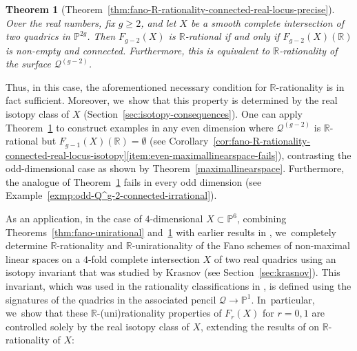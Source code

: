\documentclass[JEP,XML,SOM,Unicode,NoEqCountersInSection,published]{cedram}
\let\cal\mathcal
\let\bb\mathbb\let\Bbb\mathbb
\theoremstyle{plain}
\newtheorem{thm}{Theorem}[section]
\theoremstyle{definition}
\renewcommand\P{\mathbb{P}}
\newcommand\R{\mathbb{R}}
\begin{document}
\begin{thm}[Theorem~\ref{thm:fano-R-rationality-connected-real-locus-precise}]\label{thm:fano-R-rationality-connected-real-locus}
Over the real numbers, fix $g\geq 2$, and let $X$ be a smooth complete intersection of two quadrics in $\P^{2g}$.
Then $F_{g-2}(X)$ is $\R$-rational if and only if $F_{g-2}(X)(\R)$ is non-empty and connected. Furthermore, this is equivalent to \(\bb R\)-rationality of the surface $\mathcal{Q}^{(g-2)}$.
\end{thm}
Thus, in this case, the aforementioned necessary condition for \(\bb R\)-rationality is in fact sufficient. Moreover, we~show that this property is determined by the real isotopy class of \(X\) (Section~\ref{sec:isotopy-consequences}). One can apply Theorem~\ref{thm:fano-R-rationality-connected-real-locus} to construct examples in any even dimension where $\mathcal{Q}^{(g-2)}$ is \(\bb R\)-rational but \(F_{g-1}(X)(\bb R)=\emptyset\) (see Corollary~\ref{cor:fano-R-rationality-connected-real-locus-isotopy}\eqref{item:even-maximallinearspace-fails}), contrasting the odd-dimensional case as shown by Theorem~\ref{maximallinearspace}.
Furthermore, the analogue of Theorem~\ref{thm:fano-R-rationality-connected-real-locus} fails in every odd dimension (see Example~\ref{exmp:odd-Q^g-2-connected-irrational}).

As an application, in the case of \(4\)-dimensional \(X \subset \bb P^6\), combining Theorems~\ref{thm:fano-unirational} and~\ref{thm:fano-R-rationality-connected-real-locus} with earlier results in \cite{CTSSD,HassettKoll'arTschinkel}, we~completely determine $\R$-rationality and $\R$-unirationality of the Fano schemes of non-maximal linear spaces on a $4$-fold complete intersection \(X\) of two real quadrics using an isotopy invariant that was studied by Krasnov \cite{krasnov-biquadrics} (see Section~\ref{sec:krasnov}). This invariant, which was used in the rationality classifications in \cite{HT-intersection-quadrics,HassettKoll'arTschinkel}, is defined using the signatures of the quadrics in the associated pencil \(\cal Q\to\bb P^1\). In~particular, we~show that these \(\bb R\)-(uni)rationality properties of \(F_r(X)\) for \(r=0,1\) are controlled solely by the real isotopy class of \(X\), extending the results of \cite{HassettKoll'arTschinkel} on \(\bb R\)-rationality of \(X\):
\end{document}
